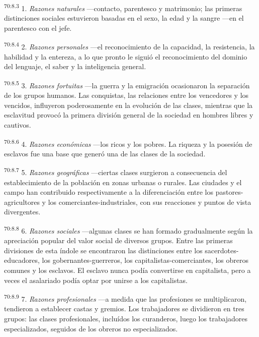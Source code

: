 \par
\textsuperscript{70:8.3} 1. \textit{Razones naturales} ---contacto, parentesco y matrimonio; las primeras distinciones sociales estuvieron basadas en el sexo, la edad y la sangre ---en el parentesco con el jefe.

\par
\textsuperscript{70:8.4} 2. \textit{Razones personales} ---el reconocimiento de la capacidad, la resistencia, la habilidad y la entereza, a lo que pronto le siguió el reconocimiento del dominio del lenguaje, el saber y la inteligencia general.

\par
\textsuperscript{70:8.5} 3. \textit{Razones fortuitas} ---la guerra y la emigración ocasionaron la separación de los grupos humanos. Las conquistas, las relaciones entre los vencedores y los vencidos, influyeron poderosamente en la evolución de las clases, mientras que la esclavitud provocó la primera división general de la sociedad en hombres libres y cautivos.

\par
\textsuperscript{70:8.6} 4. \textit{Razones económicas} ---los ricos y los pobres. La riqueza y la posesión de esclavos fue una base que generó una de las clases de la sociedad.

\par
\textsuperscript{70:8.7} 5. \textit{Razones geográficas} ---ciertas clases surgieron a consecuencia del establecimiento de la población en zonas urbanas o rurales. Las ciudades y el campo han contribuido respectivamente a la diferenciación entre los pastores-agricultores y los comerciantes-industriales, con sus reacciones y puntos de vista divergentes.

\par
\textsuperscript{70:8.8} 6. \textit{Razones sociales} ---algunas clases se han formado gradualmente según la apreciación popular del valor social de diversos grupos. Entre las primeras divisiones de esta índole se encontraron las distinciones entre los sacerdotes-educadores, los gobernantes-guerreros, los capitalistas-comerciantes, los obreros comunes y los esclavos. El esclavo nunca podía convertirse en capitalista, pero a veces el asalariado podía optar por unirse a los capitalistas.

\par
\textsuperscript{70:8.9} 7. \textit{Razones profesionales} ---a medida que las profesiones se multiplicaron, tendieron a establecer castas y gremios. Los trabajadores se dividieron en tres grupos: las clases profesionales, incluídos los curanderos, luego los trabajadores especializados, seguidos de los obreros no especializados.

